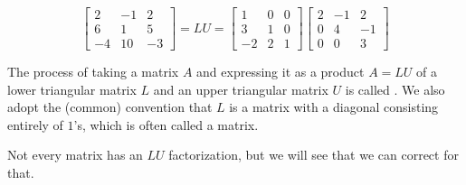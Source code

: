 \documentclass{ximera}
\begin{document}
$$\begin{bmatrix}2&-1&2\\6&1&5\\-4&10&-3\end{bmatrix}=LU=\begin{bmatrix}1&0&0\\3&1&0\\-2&2&1\end{bmatrix}\begin{bmatrix}2&-1&2\\0&4&-1\\0&0&3\end{bmatrix}$$

The process of taking a matrix $A$ and expressing it as a product $A=LU$ of a lower triangular matrix $L$ and an upper triangular matrix $U$ is called .
We also adopt the (common) convention that $L$ is a matrix with a diagonal consisting entirely of $1$'s, which is often called a  matrix.

Not every matrix has an $LU$ factorization, but we will see that we can correct for that.
\end{document}
